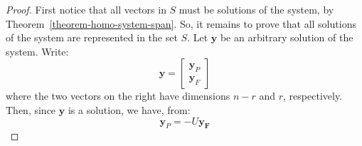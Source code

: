 \documentclass[12pt]{article}
\begin{document}
\begin{proof}
First notice that all vectors in $S$ must be solutions of the system, by Theorem~\ref{theorem-homo-system-span}. So, it remains to prove that all solutions of the system are represented in the set $S$. Let $\mathbf{y}$ be an arbitrary solution of the system. Write:
\[
\mathbf{y}=\begin{bmatrix}\mathbf{y}_P\\\mathbf{y}_F\end{bmatrix}
\]
where the two vectors on the right have dimensions $n-r$ and $r$, respectively. Then, since $\mathbf{y}$ is a solution, we have, from:
\[
\mathbf{y}_P=-U\mathbf{\mathbf{y}_F}
\]



\end{proof}
 
\end{document}
